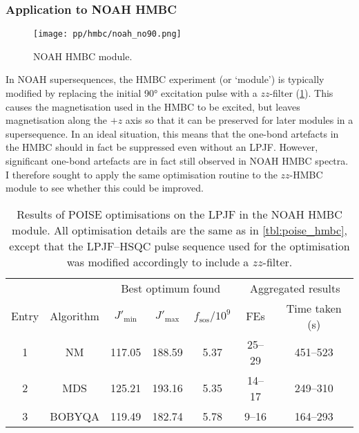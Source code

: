 \subsubsection{Application to NOAH HMBC}

\begin{figure}[htb]
    \centering
    \texttt{[image: pp/hmbc/noah\_no90.png]}%
    \caption[NOAH HMBC module]{
        NOAH HMBC module.
    }
    \label{fig:noah_hmbc_no90}
\end{figure}

In NOAH supersequences, the HMBC experiment (or `module') is typically modified by replacing the initial \ang{90} excitation pulse with a $zz$-filter (\cref{fig:noah_hmbc_no90}).\autocite{Kupce2018CC,Kupce2019JMR}
This causes the  magnetisation used in the HMBC to be excited, but leaves  magnetisation along the $+z$ axis so that it can be preserved for later modules in a supersequence.
In an ideal situation, this means that the one-bond artefacts in the HMBC should in fact be suppressed even without an LPJF.
However, significant one-bond artefacts are in fact still observed in NOAH HMBC spectra.
I therefore sought to apply the same optimisation routine to the $zz$-HMBC module to see whether this could be improved.


\begin{table}[htb]
    \centering
    \begin{tabular}{ccccccc}
        \toprule
              &           & \multicolumn{3}{c}{Best optimum found} & \multicolumn{2}{c}{Aggregated results} \\
        \cmidrule(lr){3-5} \cmidrule(lr){6-7}
        Entry & Algorithm & $J'_\text{min}$ & $J'_\text{max}$ & $f_\text{sos} / 10^9$ & FEs & Time taken (\unit{\s}) \\
        \midrule
        1     & NM        & 117.05 & 188.59                 & 5.37 & 25--29 & 451--523 \\
        2     & MDS       & 125.21 & 193.16                 & 5.35 & 14--17 & 249--310 \\
        3     & BOBYQA    & 119.49 & 182.74                 & 5.78 & 9--16  & 164--293 \\
        \bottomrule
    \end{tabular}
    \caption[NOAH HMBC low-pass J-filter optimisations]{
        Results of POISE optimisations on the LPJF in the NOAH HMBC module.
        All optimisation details are the same as in \cref{tbl:poise_hmbc}, except that the LPJF--HSQC pulse sequence used for the optimisation was modified accordingly to include a $zz$-filter.
    }
    \label{tbl:poise_hmbc_noah}
\end{table}

